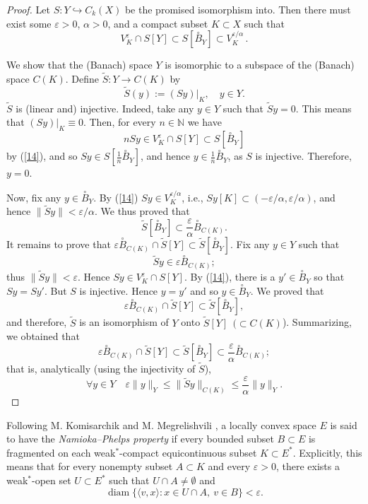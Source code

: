 \documentclass[12pt]{amsart}
\theoremstyle{plain}
\theoremstyle{definition}
\theoremstyle{remark}
\def\ee{\varepsilon}
\def\N{{\mathbb N}}
\def\ee{\varepsilon}
\def\ee{\varepsilon}
\begin{document}
\begin{proof}
Let $S:Y\hookrightarrow C_k(X)$ be the promised isomorphism into. Then there must exist some $\ee>0$, $\alpha>0$, and a compact subset $K\subset X$ such that
\begin{equation}\label{14}
V^\ee_K \cap S[Y] \subset S[\stackrel \circ B_Y]\subset V^{\ee/\alpha}_K\,.
\end{equation}

We show that the (Banach) space $Y$ is isomorphic to a subspace of the (Banach) space $C(K)$.
Define $\tilde S:Y\to C(K)$ by
$$
\tilde S(y):= (Sy)|_K, \quad y\in Y.
$$
$\tilde S$ is (linear and) injective. Indeed, take any $y\in Y$ such that $\tilde Sy=0$. This means that
$(Sy)|_K\equiv0$. Then, for every $n\in \N$ we have
$$
n Sy\in V^\ee_K\cap S[Y] \subset S[\stackrel \circ B_Y]
$$
by (\ref{14}), and so $Sy\in S[\frac1{n} \stackrel \circ B_Y]$, and hence $y\in \frac 1{n} \stackrel \circ B_Y$, as $S$ is injective. Therefore, $y=0$.

Now, fix any $y\in \stackrel \circ B_Y$. By (\ref{14}) $Sy \in V^{\ee/\alpha}_K$, i.e., $Sy[K] \subset (-\ee/\alpha,\ee/\alpha)$, and hence $\|\tilde Sy\| <\ee/\alpha$. We thus proved that
$$
\tilde S[\stackrel \circ B_Y] \subset \frac\ee\alpha \stackrel \circ B_{C(K)}.
$$
It remains to prove that
$\ee \stackrel \circ B_{C(K)}\cap \tilde S[Y] \subset \tilde S[\stackrel \circ B_Y]$.
Fix any $y\in Y$ such that $$\tilde Sy \in \varepsilon \stackrel \circ B_{C(K)};$$ thus $\|\tilde Sy\| <\varepsilon$.
Hence %
$Sy\in V^\ee_K \cap S[Y]$.
By (\ref{14}), there is a $y'\in \stackrel\circ B_Y$ so that $Sy=Sy'$. But $S$ is  injective. Hence $ y=y'$ and so $y\in \stackrel \circ B_Y$.
We proved that
$$\varepsilon \stackrel \circ B_{C(K)} \cap \tilde S[Y] \subset \tilde S[\stackrel \circ B_Y],$$
and therefore, $\tilde S$ is an isomorphism of $Y$ onto $\tilde S[Y] \  \ (\subset C(K)$). Summarizing, we obtained that
$$
\ee \stackrel \circ B_{C(K)}\cap \tilde S[Y] \subset \tilde S[\stackrel \circ B_Y] \subset \frac\ee\alpha \stackrel \circ B_{C(K)};
$$
that is, analytically (using the injectivity of $\tilde S$),
$$
\forall y\in Y\quad \ee\|y\|_Y \le  \|\tilde Sy\|_{C(K)} \le \frac\ee\alpha \|y\|_Y.$$
  \end{proof}


Following M. Komisarchik and M. Megrelishvili \cite{KM}, a locally convex space $E$ is said to have the \emph{Namioka--Phelps property} if every bounded subset $B\subset E$ is fragmented on each weak$^*$-compact equicontinuous subset $K\subset E^*$. Explicitly, this means that for every nonempty subset $A\subset K$ and every $\varepsilon>0$, there exists a weak$^*$-open set $U\subset E^*$ such that $U\cap A\neq\emptyset$ and
\[
\operatorname{diam}\{\langle v,x\rangle : x\in U\cap A,\ v\in B\}<\varepsilon.
\]
\end{document}
